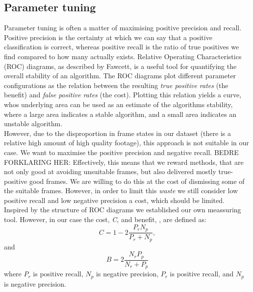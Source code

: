 \subsection{Parameter tuning}\label{sec:ph1tweaking}
%
Parameter tuning is often a matter of maximising positive precision and recall. Positive precision is the certainty at which we can say that a positive classification is correct, whereas positive recall is the ratio of true positives we find compared to how many actually exists. Relative Operating Characteristics (ROC) diagrams, as described by Fawcett\cite{Fawcett06a}, is a useful tool for quantifying the overall stability of an algorithm. The ROC diagrams plot different parameter configurations as the relation between the resulting \textit{true positive rates} (the benefit) and \textit{false positive rates} (the cost). Plotting this relation yields a curve, whos underlying area can be used as an estimate of the algorithms stability, where a large area indicates a stable algorithm, and a small area indicates an unstable algorithm.\\
However, due to the disproportion in frame states in our dataset (there is a relative high amount of high quality footage), this approach is not suitable in our case. We want to maximise the positive precision and negative recall. BEDRE FORKLARING HER: Effectively, this means that we reward methods, that are not only good at avoiding unsuitable frames, but also delivered mostly true-positive good frames. We are willing to do this at the cost of dismissing some of the suitable frames. However, in order to limit this \textit{waste} we still consider low positive recall and low negative precision a cost, which should be limited. Inspired by the structure of ROC diagrams we established our own meassuring tool. However, in our case the cost, \textit{C}, and benefit, , are defined as:
\[
C = 1 - 2\frac{P_{r}N_{p}}{P_{r} + N_{p}},
\]
and
\[
B = 2\frac{N_{r} P_{p}}{N_{r} + P_{p}}
\]
where $P_r$ is positive recall, $N_p$ is negative precision, $P_r$ is positive recall, and $N_p$ is negative precision.\\
%
